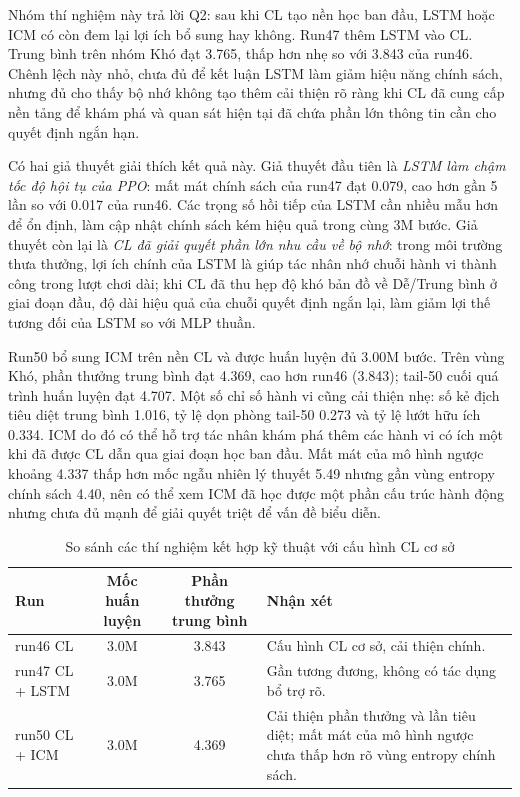 Nhóm thí nghiệm này trả lời Q2: sau khi CL tạo nền học ban đầu, LSTM hoặc ICM có còn đem lại lợi ích bổ sung hay không. Run47 thêm LSTM vào CL. Trung bình trên nhóm Khó đạt 3.765, thấp hơn nhẹ so với 3.843 của run46. Chênh lệch này nhỏ, chưa đủ để kết luận LSTM làm giảm hiệu năng chính sách, nhưng đủ cho thấy bộ nhớ không tạo thêm cải thiện rõ ràng khi CL đã cung cấp nền tảng để khám phá và quan sát hiện tại đã chứa phần lớn thông tin cần cho quyết định ngắn hạn.

Có hai giả thuyết giải thích kết quả này. Giả thuyết đầu tiên là \textit{LSTM làm chậm tốc độ hội tụ của PPO}: mất mát chính sách của run47 đạt 0.079, cao hơn gần 5 lần so với 0.017 của run46. Các trọng số hồi tiếp của LSTM cần nhiều mẫu hơn để ổn định, làm cập nhật chính sách kém hiệu quả trong cùng 3M bước. Giả thuyết còn lại là \textit{CL đã giải quyết phần lớn nhu cầu về bộ nhớ}: trong môi trường thưa thưởng, lợi ích chính của LSTM là giúp tác nhân nhớ chuỗi hành vi thành công trong lượt chơi dài; khi CL đã thu hẹp độ khó bản đồ về Dễ/Trung bình ở giai đoạn đầu, độ dài hiệu quả của chuỗi quyết định ngắn lại, làm giảm lợi thế tương đối của LSTM so với MLP thuần.

Run50 bổ sung ICM trên nền CL và được huấn luyện đủ 3.00M bước. Trên vùng Khó, phần thưởng trung bình đạt 4.369, cao hơn run46 (3.843); tail-50 cuối quá trình huấn luyện đạt 4.707. Một số chỉ số hành vi cũng cải thiện nhẹ: số kẻ địch tiêu diệt trung bình 1.016, tỷ lệ dọn phòng tail-50 0.273 và tỷ lệ lướt hữu ích 0.334. ICM do đó có thể hỗ trợ tác nhân khám phá thêm các hành vi có ích một khi đã được CL dẫn qua giai đoạn học ban đầu. Mất mát của mô hình ngược khoảng 4.337 thấp hơn mốc ngẫu nhiên lý thuyết 5.49 nhưng gần vùng entropy chính sách 4.40, nên có thể xem ICM đã học được một phần cấu trúc hành động nhưng chưa đủ mạnh để giải quyết triệt để vấn đề biểu diễn.

\begin{table}[H]
    \centering
    \small
    \caption{So sánh các thí nghiệm kết hợp kỹ thuật với cấu hình CL cơ sở}
    \label{tab:stacking_tests}
    \begin{tabular}{|p{3.5cm}|c|c|p{4.2cm}|}
        \hline
        \textbf{Run} & \textbf{Mốc huấn luyện} & \textbf{Phần thưởng trung bình} & \textbf{Nhận xét} \\
        \hline
        run46 CL & 3.0M & 3.843 & Cấu hình CL cơ sở, cải thiện chính. \\
        \hline
        run47 CL + LSTM & 3.0M & 3.765 & Gần tương đương, không có tác dụng bổ trợ rõ. \\
        \hline
        run50 CL + ICM & 3.0M & 4.369 & Cải thiện phần thưởng và lần tiêu diệt; mất mát của mô hình ngược chưa thấp hơn rõ vùng entropy chính sách. \\
        \hline
    \end{tabular}
\end{table}

